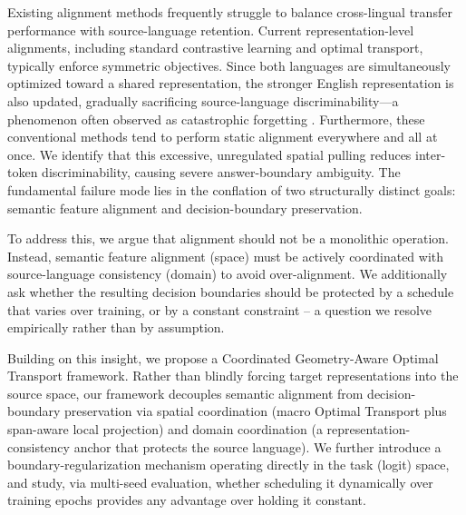 \documentclass[11pt]{article}
\begin{document}
Existing alignment methods frequently struggle to balance cross-lingual transfer performance with source-language retention. Current representation-level alignments, including standard contrastive learning and optimal transport, typically enforce symmetric objectives. Since both languages are simultaneously optimized toward a shared representation, the stronger English representation is also updated, gradually sacrificing source-language discriminability—a phenomenon often observed as catastrophic forgetting \cite{koloski2025measuringcatastrophicforgettingcrosslingual}. Furthermore, these conventional methods tend to perform static alignment everywhere and all at once. We identify that this excessive, unregulated spatial pulling reduces inter-token discriminability, causing severe answer-boundary ambiguity. The fundamental failure mode lies in the conflation of two structurally distinct goals: semantic feature alignment and decision-boundary preservation.

To address this, we argue that alignment should not be a monolithic operation. Instead, semantic feature alignment (space) must be actively coordinated with source-language consistency (domain) to avoid over-alignment. We additionally ask whether the resulting decision boundaries should be protected by a schedule that varies over training, or by a constant constraint -- a question we resolve empirically rather than by assumption.

Building on this insight, we propose a Coordinated Geometry-Aware Optimal Transport framework. Rather than blindly forcing target representations into the source space, our framework decouples semantic alignment from decision-boundary preservation via spatial coordination (macro Optimal Transport plus span-aware local projection) and domain coordination (a representation-consistency anchor that protects the source language). We further introduce a boundary-regularization mechanism operating directly in the task (logit) space, and study, via multi-seed evaluation, whether scheduling it dynamically over training epochs provides any advantage over holding it constant.
\end{document}
